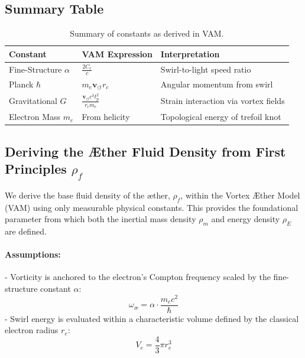 \documentclass[preprint]{revtex4-2}
\begin{document}
            \subsection*{Summary Table}
        
            \begin{table}[H]
                \centering
                \begin{tabular}{|l|l|l|}
                    \hline
                    \textbf{Constant} & \textbf{VAM Expression} & \textbf{Interpretation} \\
                    \hline
                    Fine-Structure \( \alpha \) & \( \frac{2C_e}{c} \) & Swirl-to-light speed ratio \\
                    Planck \( \hbar \) & \( m_e \mathbf{v}_{\scriptscriptstyle\boldsymbol{\circlearrowleft}} r_c \) & Angular momentum from swirl \\
                    Gravitational \( G \) & \( \frac{\mathbf{v}_{\scriptscriptstyle\boldsymbol{\circlearrowleft}} c^3 t_p^2}{r_c m_e} \) & Strain interaction via vortex fields \\
                    Electron Mass \( m_e \) & From helicity & Topological energy of trefoil knot \\
                    \hline
                \end{tabular}
                \caption{Summary of constants as derived in VAM.}
                \label{tab:constants_summary}
            \end{table}
        
            \subsection{Deriving the Æther Fluid Density from First Principles \boldmath\( \rho_{\scriptscriptstyle\boldsymbol\!f} \)}
                \label{sec:aether_fluid_density}
        
                We derive the base fluid density of the æther, \textbf{\boldmath\( \rho_{\scriptscriptstyle\boldsymbol\!f} \)}, within the Vortex \AE{}ther Model (VAM) using only measurable physical constants. This provides the foundational parameter from which both the inertial mass density \textbf{\boldmath\( \rho_{\scriptscriptstyle\boldsymbol\!m} \)} and energy density \textbf{\boldmath\( \rho_{\scriptscriptstyle\boldsymbol\!E} \)} are defined.
        
                \paragraph{Assumptions:}
                - Vorticity is anchored to the electron’s Compton frequency scaled by the fine-structure constant \( \alpha \):
                \[
                \omega_{\text{\ae}} = \alpha \cdot \frac{m_e c^2}{\hbar}
                \]
                - Swirl energy is evaluated within a characteristic volume defined by the classical electron radius \( r_e \):
                \[
                V_e = \frac{4}{3} \pi r_e^3
                \]
        
\end{document}
